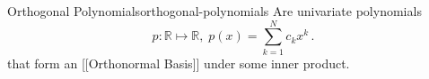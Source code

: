 \begin{definition}{Orthogonal Polynomials}{orthogonal-polynomials}
  Are univariate polynomials
  \[p: \mathbb{R} \mapsto \mathbb{R}, \; p(x) = \sum_{k=1}^N c_k x^k\,.\]
  that form an {[}{[}Orthonormal Basis{]}{]} under some inner product.
\end{definition}

